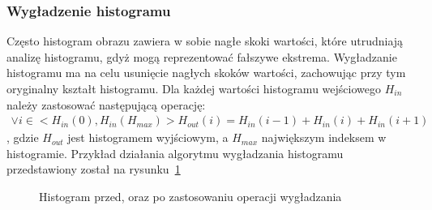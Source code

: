 \subsubsection{Wygładzenie histogramu}
Często histogram obrazu zawiera w sobie nagłe skoki wartości, które utrudniają analizę histogramu, gdyż mogą reprezentować fałszywe ekstrema. Wygładzanie histogramu ma na celu usunięcie nagłych skoków wartości, zachowując przy tym oryginalny kształt histogramu. Dla każdej wartości histogramu wejściowego \textit{$H_{in}$} należy zastosować następującą operację:
\begin{gather*}
  \vee i \in <H_{in}(0), H_{in}(H_{max})> H_{out}(i) = H_{in}(i-1) + H_{in}(i) + H_{in}(i+1)
\end{gather*},
gdzie \textit{$H_{out}$} jest histogramem wyjściowym, a $H_{max}$ największym indeksem w histogramie. Przykład działania algorytmu wygładzania histogramu przedstawiony został na rysunku~\ref{fig:histogram_smooth}
\begin{figure}
  \centering
  \caption{Histogram przed, oraz po zastosowaniu operacji wygładzania}
  \label{fig:histogram_smooth}
\end{figure}
